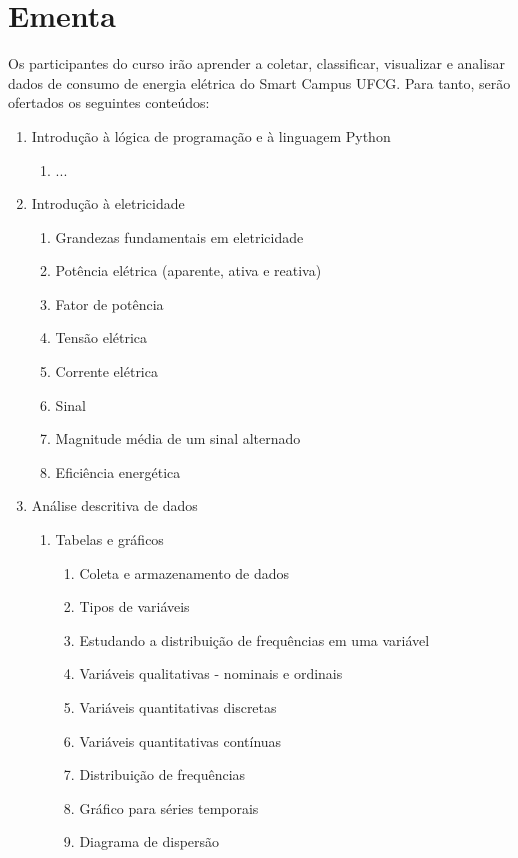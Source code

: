 \section{Ementa}
Os participantes do curso irão aprender a coletar, classificar, visualizar e analisar dados de consumo de energia elétrica do Smart Campus UFCG. Para tanto, serão ofertados os seguintes conteúdos:

\begin{enumerate}
	\item Introdução à lógica de programação e à linguagem Python
		\begin{enumerate}
			\item ...
		\end{enumerate}
	\item Introdução à eletricidade
		\begin{enumerate}
			\item Grandezas fundamentais em eletricidade
			\item Potência elétrica (aparente, ativa e reativa)
			\item Fator de potência
			\item Tensão elétrica
			\item Corrente elétrica
			\item Sinal
			\item Magnitude média de um sinal alternado
			\item Eficiência energética
		\end{enumerate}
	\item Análise descritiva de dados
		\begin{enumerate}
			\item Tabelas e gráficos
			\begin{enumerate}
				\item Coleta e armazenamento de dados
				\item Tipos de variáveis
				\item Estudando a distribuição de frequências em uma variável
				\item Variáveis qualitativas - nominais e ordinais
				\item Variáveis quantitativas discretas
				\item Variáveis quantitativas contínuas
				\item Distribuição de frequências
				\item Gráfico para séries temporais
				\item Diagrama de dispersão
			\end{enumerate}

\end{enumerate}
\end{enumerate}

